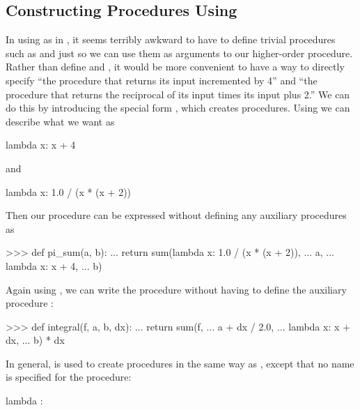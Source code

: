 \subsection{Constructing Procedures Using }
\label{Section 1.3.2}

In using  as in , it seems terribly awkward to
have to define trivial procedures such as  and 
just so we can use them as arguments to our higher-order procedure.  Rather
than define  and , it would be more convenient to
have a way to directly specify ``the procedure that returns its input
incremented by 4'' and ``the procedure that returns the reciprocal of its input
times its input plus 2.''  We can do this by introducing the special form
, which creates procedures.  Using  we can describe
what we want as

\begin{codeBlock}
lambda x: x + 4
\end{codeBlock}

\noindent
and

\begin{codeBlock}
lambda x: 1.0 / (x * (x + 2))
\end{codeBlock}

\noindent
Then our  procedure can be expressed without defining any
auxiliary procedures as

\begin{codeBlock}
>>> def pi_sum(a, b):
...     return sum(lambda x: 1.0 / (x * (x + 2)),
...                a,
...                lambda x: x + 4,
...                b)
\end{codeBlock}

\noindent
Again using , we can write the  procedure without
having to define the auxiliary procedure :

\begin{codeBlock}
>>> def integral(f, a, b, dx):
...     return sum(f,
...                a + dx / 2.0,
...                lambda x: x + dx,
...                b) * dx
\end{codeBlock}

\noindent
In general,  is used to create procedures in the same way as
, except that no name is specified for the procedure:

\begin{syntaxForm}
lambda : 
\end{syntaxForm}

